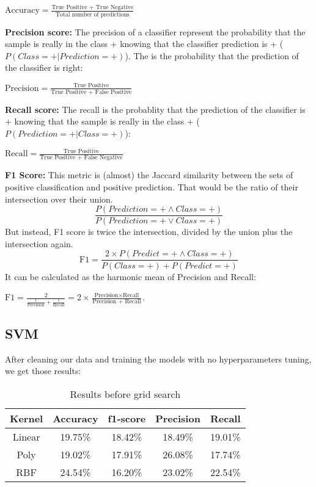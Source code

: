 \documentclass[twocolumn]{article}
\begin{document}
\(\displaystyle \text{Accuracy} = \frac{\text{True Positive + True Negative}}{\text{Total number of predictions}} \)

\textbf{Precision score:} The precision of a classifier represent the probability that the sample is really in the class + knowing that the classifier prediction is + ($P(Class=+ | Prediction = +)$). The is the probability that the prediction of the classifier is right:

\(\displaystyle \text{Precision} = \frac{\text{True Positive}}{\text{True Positive + False Positive}}\)

\textbf{Recall score:} The recall is the probablity that the prediction of the classifier is + knowing that the sample is really in the class + ($P(Prediction=+ | Class = +)$):

\(\displaystyle \text{Recall} = \frac{\text{True Positive}}{\text{True Positive + False Negative}}\)


\textbf{F1 Score:} This metric is (almost) the Jaccard similarity between the sets of positive classification and positive prediction. That would be the ratio of their intersection over their union. 
$$\frac{P(Prediction=+ \land Class = +)}{P(Prediction=+ \lor Class = +)}$$
But instead, F1 score is twice the intersection, divided by the union plus the intersection again.
$$\text{F1} = \frac{2 \times P(Predict =+ \land Class = +)}{P(Class = +) +  P(Predict=+)}$$
It can be calculated as the harmonic mean of Precision and Recall:

\(\displaystyle \text{F1} = \frac{2}{\frac{1}{\text{Precision}} + \frac{1}{\text{Recall}}} \displaystyle = 2 \times \frac{\text{Precision}\times\text{Recall}}{\text{Precision + Recall}} \). 

\subsection{SVM}
After cleaning our data and training the models with no hyperparameters tuning, we get those results:

\begin{table}[h]
    \centering
    \begin{tabular}{|c|c|c|c|c|}
    \hline
      Kernel & Accuracy & f1-score & Precision & Recall\\  
      \hline
      Linear & 19.75\% & 18.42\% & 18.49\% & 19.01\%\\
        \hline
      Poly & 19.02\% & 17.91\% & 26.08\% & 17.74\% \\
        \hline
      RBF & 24.54\% & 16.20\% & 23.02\% & 22.54\% \\
    \hline
    \end{tabular}
    \label{tab:my_label}
    \caption{Results before grid search}

\end{table}
\end{document}

